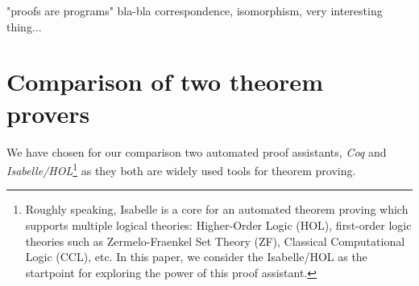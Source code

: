 \documentclass[article]{aaltoseries}
\begin{document}
"proofs are programs"
bla-bla correspondence, isomorphism, very interesting thing...




		




\section{Comparison of two theorem provers}
\label{sec:comparison}

We have chosen for our comparison two automated proof assistants, \textit{Coq} and \textit{Isabelle/HOL}\footnote{Roughly speaking, Isabelle is a core for an automated theorem proving which supports multiple logical theories: Higher-Order Logic (HOL), first-order logic theories such as Zermelo-Fraenkel Set Theory (ZF), Classical Computational Logic (CCL), etc. In this paper, we consider the Isabelle/HOL as the startpoint for exploring the power of this proof assistant.} as they both are widely used tools for theorem proving.
\end{document}

